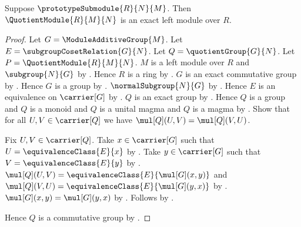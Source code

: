 \begin{theorem}\label{spike_quotient_module_is_exact}
    Suppose $\prototypeSubmodule{R}{N}{M}$.
    Then $\QuotientModule{R}{M}{N}$ is an exact left module over $R$.
\end{theorem}
\begin{proof}
    Let $G=\ModuleAdditiveGroup{M}$.
    Let $E=\subgroupCosetRelation{G}{N}$.
    Let $Q=\quotientGroup{G}{N}$.
    Let $P=\QuotientModule{R}{M}{N}$.
    $M$ is a left module over $R$ and $\subgroup{N}{G}$ by
        .
    Hence $R$ is a ring by .
    $G$ is an exact commutative group by
        .
    Hence $G$ is a group by .
    $\normalSubgroup{N}{G}$ by .
    Hence $E$ is an equivalence on $\carrier[G]$ by
        .
    $Q$ is an exact group by .
    Hence $Q$ is a group and $Q$ is a monoid and
        $Q$ is a unital magma and $Q$ is a magma by
        .
    Show that for all $U,V\in\carrier[Q]$ we have
        $\mul[Q](U,V)=\mul[Q](V,U)$.
    \begin{subproof}
        Fix $U,V\in\carrier[Q]$.
        Take $x\in\carrier[G]$ such that
            $U=\equivalenceClass{E}{x}$ by
            .
        Take $y\in\carrier[G]$ such that
            $V=\equivalenceClass{E}{y}$ by
            .
        $\mul[Q](U,V)=\equivalenceClass{E}{\mul[G](x,y)}$ and
            $\mul[Q](V,U)=\equivalenceClass{E}{\mul[G](y,x)}$ by
            .
        $\mul[G](x,y)=\mul[G](y,x)$ by
            .
        Follows by \auto.
    \end{subproof}
    Hence $Q$ is a commutative group by
        .


\end{proof}
